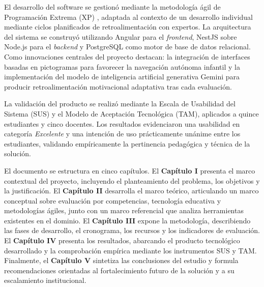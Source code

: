 El desarrollo del software se gestionó mediante la metodología ágil de Programación Extrema (XP) \cite{ref53_beck,ref47_ganney_xp}, adaptada al contexto de un desarrollo individual mediante ciclos planificados de retroalimentación con expertos. La arquitectura del sistema se construyó utilizando Angular \cite{ref49_angular} para el \textit{frontend}, NestJS sobre Node.js \cite{ref50_nodejs} para el \textit{backend} y PostgreSQL \cite{ref51_postgresql} como motor de base de datos relacional. Como innovaciones centrales del proyecto destacan: la integración de interfaces basadas en pictogramas para favorecer la navegación autónoma infantil y la implementación del modelo de inteligencia artificial generativa Gemini para producir retroalimentación motivacional adaptativa tras cada evaluación.

La validación del producto se realizó mediante la Escala de Usabilidad del Sistema (SUS) y el Modelo de Aceptación Tecnológica (TAM), aplicados a quince estudiantes y cinco docentes. Los resultados evidenciaron una usabilidad en categoría \textit{Excelente} y una intención de uso prácticamente unánime entre los estudiantes, validando empíricamente la pertinencia pedagógica y técnica de la solución.

El documento se estructura en cinco capítulos. El \textbf{Capítulo I} presenta el marco contextual del proyecto, incluyendo el planteamiento del problema, los objetivos y la justificación. El \textbf{Capítulo II} desarrolla el marco teórico, articulando un marco conceptual sobre evaluación por competencias, tecnología educativa y metodologías ágiles, junto con un marco referencial que analiza herramientas existentes en el dominio. El \textbf{Capítulo III} expone la metodología, describiendo las fases de desarrollo, el cronograma, los recursos y los indicadores de evaluación. El \textbf{Capítulo IV} presenta los resultados, abarcando el producto tecnológico desarrollado y la comprobación empírica mediante los instrumentos SUS y TAM. Finalmente, el \textbf{Capítulo V} sintetiza las conclusiones del estudio y formula recomendaciones orientadas al fortalecimiento futuro de la solución y a su escalamiento institucional.
